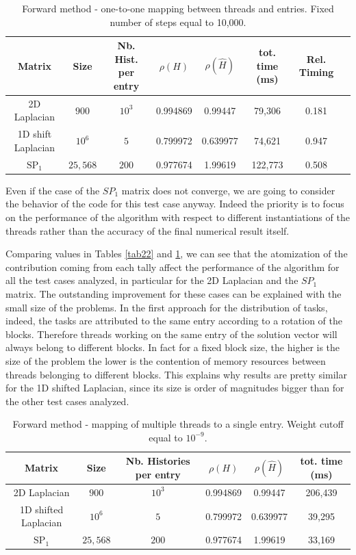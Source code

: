 \documentclass[a4paper,10pt]{article}
\begin{document}
\begin{table}[!h]
\hspace*{-1cm}
\begin{tabular}{|c|c|c|c|c|c|c|c|}
\hline
\textbf{Matrix} & \textbf{Size} &\textbf{Nb. Hist. per entry} & $\rho(H)$ 
& $\rho(\hat{H})$ & tot. time (ms) & Rel. Timing\\
\hline
2D Laplacian& $900$ & $10^3$ & 0.994869 & 0.99447 & 79,306 & 0.181\\
\hline 
1D shift Laplacian& $10^6$ & $5$ & 0.799972 & 0.639977 & 74,621 & 0.947\\
\hline
$\text{SP}_1$ & $25,568$ & $200$ & 0.977674 & 1.99619 & 122,773 & 0.508\\
\hline
\end{tabular}
\caption{Forward method - one-to-one mapping between threads and entries. Fixed 
number of steps equal to 10,000.}
\label{tab23}
\end{table}


Even if the case of the $SP_1$ matrix does not converge, we are going to 
consider the behavior of the code for this test case anyway. Indeed the 
priority is to
focus on the performance of the algorithm with respect to different 
instantiations of the threads rather than the accuracy of the final 
numerical result 
itself.

Comparing values in Tables \ref{tab22} and \ref{tab23}, we can see that the 
atomization of the contribution coming from each tally affect the 
performance of the algorithm for all the test cases analyzed, in particular for 
the 2D Laplacian and the $SP_1$ matrix. The outstanding improvement for these 
cases can be explained with the small size of the problems. 
In the first approach for the distribution of tasks, indeed, the tasks are 
attributed to the same entry according to a rotation of the blocks. Therefore 
threads working on the same entry of the solution vector will always belong to 
different blocks. In fact for a 
fixed block size, the higher is the size of the problem the lower is the 
contention of memory resources between threads belonging to different blocks.
This explains why results are pretty similar for the 1D shifted Laplacian, 
since its size is order of magnitudes bigger than for the other test cases 
analyzed.


\begin{table}[!h]
\hspace*{-1cm}
\begin{tabular}{|c|c|c|c|c|c|}
\hline
\textbf{Matrix} & \textbf{Size} &\textbf{Nb. Histories per entry} & $\rho(H)$ 
& $\rho(\hat{H})$ & tot. time (ms)\\
\hline
2D Laplacian& $900$ & $10^3$ & 0.994869 & 0.99447 & 206,439 \\
\hline 
1D shifted Laplacian& $10^6$ & $5$ & 0.799972 & 0.639977 & 39,295\\
\hline
$\text{SP}_1$ & $25,568$ & $200$ & 0.977674 & 1.99619 & 33,169\\
\hline
\end{tabular}
\caption{Forward method - mapping of multiple threads to a single entry. 
Weight cutoff equal to $10^{-9}$.}
\label{tab24}
\end{table}
\end{document}

